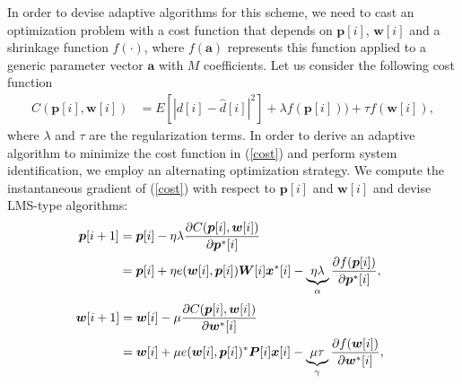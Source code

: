 \documentclass[10pt,onecolumn]{IEEEtran}
\begin{document}
In order to devise adaptive algorithms for this scheme, we need to
cast an optimization problem with a cost function that depends on
${\boldsymbol p}[i]$, ${\boldsymbol w}[i]$ and a shrinkage function
$f(\cdot)$,  where $f({\boldsymbol a})$ represents this function
applied to a generic parameter vector ${\boldsymbol a}$ with $M$
coefficients. Let us consider the following cost function
\begin{equation}
\begin{split}
C({\boldsymbol p}[i], {\boldsymbol w}[i]) & = E[|d[i] -
\hat{d}[i]|^2] + \lambda f({\boldsymbol p}[i]) )+ \tau
f({\boldsymbol w}[i]), \label{cost}
\end{split}
\end{equation}
where $\lambda$ and $\tau$ are the regularization terms. In order to
derive an adaptive algorithm to minimize the cost function in
(\ref{cost}) and perform system identification, we employ an
alternating optimization strategy. We compute the instantaneous
gradient of (\ref{cost}) with respect to ${\boldsymbol p}[i]$ and
${\boldsymbol w}[i]$ and devise LMS-type algorithms:
\vspace{-0.25em}
\begin{equation}
\begin{split}
\hspace{-0.5em}{\boldsymbol p}[i+1] & = {\boldsymbol p}[i] - \eta
\lambda \frac{\partial C({\boldsymbol p}[i], {\boldsymbol
w}[i])}{\partial {\boldsymbol
p}^*[i] } \\
& ={\boldsymbol p}[i] + \eta e({\boldsymbol w}[i],{\boldsymbol
p}[i]) {\boldsymbol W}[i] {\boldsymbol x}^*[i] - \underbrace{\eta
\lambda}_{\alpha} \frac{\partial f({\boldsymbol p}[i])}{\partial
{\boldsymbol p}^*[i] },\label{prec}
\end{split}
\end{equation}
\vspace{-0.75em}
\begin{equation}
\begin{split}
\hspace{-0.5em}{\boldsymbol w}[i+1] & = {\boldsymbol w}[i] - \mu
\frac{\partial C({\boldsymbol p}[i], {\boldsymbol w}[i])}{\partial
{\boldsymbol
w}^*[i] } \\
& ={\boldsymbol w}[i] + \mu e({\boldsymbol w}[i],{\boldsymbol
p}[i])^* {\boldsymbol P}[i] {\boldsymbol x}[i] - \underbrace{\mu
\tau}_{\gamma} \frac{\partial f({\boldsymbol w}[i])}{\partial
{\boldsymbol w}^*[i] } ,\label{wrec}
\end{split}
\end{equation}
\end{document}
